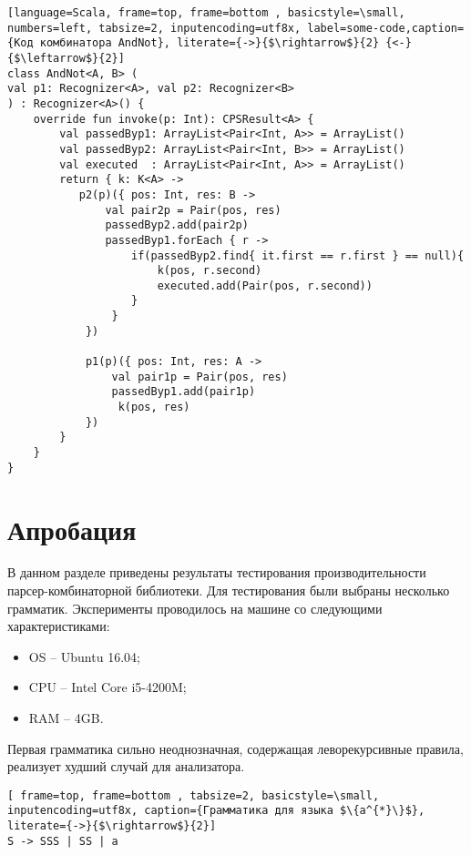 \documentclass[14pt]{matmex-diploma}
\begin{document}
\begin{lstlisting}[language=Scala, frame=top, frame=bottom , basicstyle=\small, numbers=left, tabsize=2, inputencoding=utf8x, label=some-code,caption={Код комбинатора AndNot}, literate={->}{$\rightarrow$}{2} {<-}{$\leftarrow$}{2}]
class AndNot<A, B> (
val p1: Recognizer<A>, val p2: Recognizer<B>
) : Recognizer<A>() {
    override fun invoke(p: Int): CPSResult<A> {
        val passedByp1: ArrayList<Pair<Int, A>> = ArrayList()
        val passedByp2: ArrayList<Pair<Int, B>> = ArrayList()
        val executed  : ArrayList<Pair<Int, A>> = ArrayList()
        return { k: K<A> ->
           p2(p)({ pos: Int, res: B ->
               val pair2p = Pair(pos, res)
               passedByp2.add(pair2p)
               passedByp1.forEach { r ->
                   if(passedByp2.find{ it.first == r.first } == null){
                       k(pos, r.second)
                       executed.add(Pair(pos, r.second))
                   }
                }
            })

            p1(p)({ pos: Int, res: A ->
                val pair1p = Pair(pos, res)
                passedByp1.add(pair1p)
                 k(pos, res)
            })
        }
    }
}
\end{lstlisting}

\section{Апробация}
В данном разделе приведены результаты тестирования производительности парсер-комбинаторной библиотеки. Для тестирования были выбраны несколько грамматик. Эксперименты проводилось на машине со следующими характеристиками:
\begin{itemize}
     \item  OS  -- Ubuntu 16.04;
     \item  CPU -- Intel Core i5-4200M;
     \item  RAM -- 4GB.
\end{itemize}

 Первая грамматика сильно неоднозначная, содержащая леворекурсивные правила, реализует худший случай для анализатора.
\begin{lstlisting}[ frame=top, frame=bottom , tabsize=2, basicstyle=\small, inputencoding=utf8x, caption={Грамматика для языка $\{a^{*}\}$}, literate={->}{$\rightarrow$}{2}]
S -> SSS | SS | a
\end{lstlisting}

\end{document}
